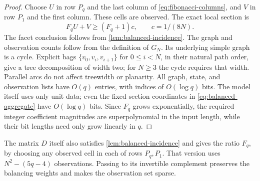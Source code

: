 \begin{proof}
Choose $U$ in row $P_q$ and the last column of
\eqref{eq:fibonacci-columns}, and $V$ in row $P_1$ and the first
column. These cells are observed. The exact local section is
\begin{equation}\label{eq:fibonacci-edge}
 F_q U+V\ge(F_q+1)c,\qquad c=1/(8N).
\end{equation}
The facet conclusion follows from \cref{lem:balanced-incidence}.
The graph and observation counts follow from the definition of $G_N$.
Its underlying simple graph is a cycle. Explicit bags
$\{v_0,v_i,v_{i+1}\}$ for $0\le i<N$, in their natural path order,
give a tree decomposition of width two; for $N\ge3$ the cycle
requires that width. Parallel arcs do not affect treewidth or planarity.
All graph, state, and observation lists have $O(q)$ entries, with
indices of $O(\log q)$ bits. The model itself uses only unit data;
even the fixed section coordinates in \eqref{eq:balanced-aggregate}
have $O(\log q)$ bits. Since $F_q$ grows exponentially, the
required integer coefficient magnitudes are superpolynomial in the
input length, while their bit lengths need only grow linearly in $q$.
\end{proof}

The matrix $D$ itself also satisfies \cref{lem:balanced-incidence}
and gives the ratio $F_q$, by choosing any observed cell in each
of rows $P_q,P_1$. That version uses $N^2-(5q-4)$ observations.
Passing to its invertible complement preserves the balancing weights
and makes the observation set sparse.

